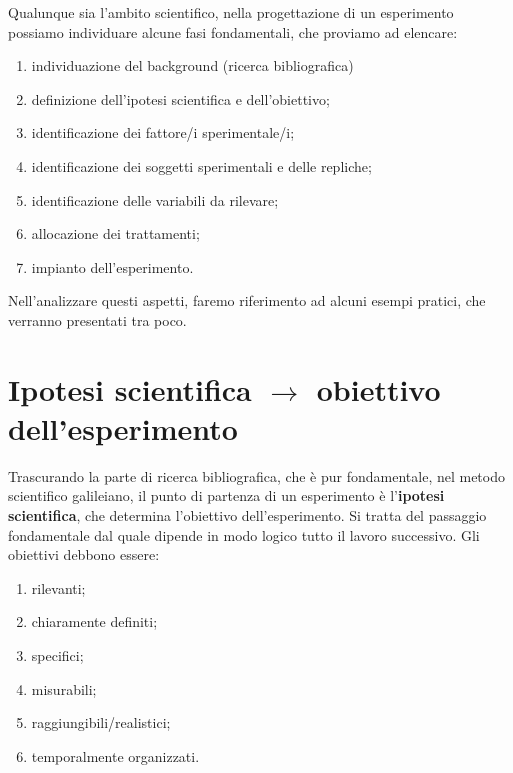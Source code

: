 \documentclass[a4paper,12pt,oneside]{book}
\providecommand{\tightlist}{%
  \setlength{\itemsep}{0pt}\setlength{\parskip}{0pt}}
\begin{document}
Qualunque sia l'ambito scientifico, nella progettazione di un esperimento possiamo individuare alcune fasi fondamentali, che proviamo ad elencare:

\begin{enumerate}
\def\labelenumi{\arabic{enumi}.}
\tightlist
\item
  individuazione del background (ricerca bibliografica)
\item
  definizione dell'ipotesi scientifica e dell'obiettivo;
\item
  identificazione dei fattore/i sperimentale/i;
\item
  identificazione dei soggetti sperimentali e delle repliche;
\item
  identificazione delle variabili da rilevare;
\item
  allocazione dei trattamenti;
\item
  impianto dell'esperimento.
\end{enumerate}

Nell'analizzare questi aspetti, faremo riferimento ad alcuni esempi pratici, che verranno presentati tra poco.

\hypertarget{ipotesi-scientifica-rightarrow-obiettivo-dellesperimento}{%
\section{\texorpdfstring{Ipotesi scientifica \(\rightarrow\) obiettivo dell'esperimento}{Ipotesi scientifica \textbackslash{}rightarrow obiettivo dell'esperimento}}\label{ipotesi-scientifica-rightarrow-obiettivo-dellesperimento}}

Trascurando la parte di ricerca bibliografica, che è pur fondamentale, nel metodo scientifico galileiano, il punto di partenza di un esperimento è l'\textbf{ipotesi scientifica}, che determina l'obiettivo dell'esperimento. Si tratta del passaggio fondamentale dal quale dipende in modo logico tutto il lavoro successivo. Gli obiettivi debbono essere:

\begin{enumerate}
\def\labelenumi{\arabic{enumi}.}
\tightlist
\item
  rilevanti;
\item
  chiaramente definiti;
\item
  specifici;
\item
  misurabili;
\item
  raggiungibili/realistici;
\item
  temporalmente organizzati.
\end{enumerate}
\end{document}
